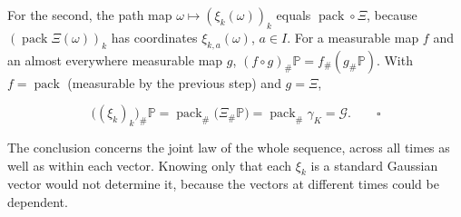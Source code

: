 \documentclass[11pt,a4paper]{report}
\begin{document}
For the second, the path map \(\omega\mapsto(\xi_k(\omega))_k\) equals \(\operatorname{pack}\circ\Xi\), because \((\operatorname{pack}\Xi(\omega))_k\) has coordinates \(\xi_{k,a}(\omega)\), \(a\in I\). For a measurable map \(f\) and an almost everywhere measurable map \(g\), \((f\circ g)_\#\mathbb P=f_\#(g_\#\mathbb P)\). With \(f=\operatorname{pack}\) (measurable by the previous step) and \(g=\Xi\),


\[\bigl((\xi_k)_k\bigr)_\#\mathbb P=\operatorname{pack}_\#\bigl(\Xi_\#\mathbb P\bigr)=\operatorname{pack}_\#\gamma_K=\mathcal G .\qquad\square\]


The conclusion concerns the joint law of the whole sequence, across all times as well as within each vector. Knowing only that each \(\xi_k\) is a standard Gaussian vector would not determine it, because the vectors at different times could be dependent.
\end{document}
